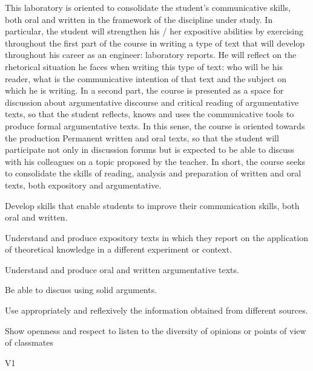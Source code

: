
\begin{syllabus}


\begin{justification}
This laboratory is oriented to consolidate the student's communicative skills, both oral and written in the framework of the discipline under study. In particular, the student will strengthen his / her expositive abilities by exercising throughout the first part of the course in writing a type of text that
will develop throughout his career as an engineer: laboratory reports. He will reflect on the rhetorical situation he faces when writing this type of text: who will be his reader, what is the communicative intention of that text and the subject on which he is writing.
In a second part, the course is presented as a space for discussion about argumentative discourse and critical reading of argumentative texts, so that the student reflects, knows and uses the communicative tools to produce formal argumentative texts. In this sense, the course is oriented towards the production
Permanent written and oral texts, so that the student will participate not only in discussion forums but is expected to be able to discuss with his colleagues on a topic proposed by the teacher. In short, the course seeks to consolidate the skills of reading, analysis and preparation of written and oral texts, both expository and argumentative.
\end{justification}

\begin{goals}
\item Develop skills that enable students to improve their communication skills, both oral and written.
\item Understand and produce expository texts in which they report on the application of theoretical knowledge in a different experiment or context.
\item Understand and produce oral and written argumentative texts.
\item Be able to discuss using solid arguments.
\item Use appropriately and reflexively the information obtained from different sources.
\item Show openness and respect to listen to the diversity of opinions or points of view of classmates
\end{goals}

\begin{outcomes}{V1}
    \item {}
    \item {}
\end{outcomes}


\end{syllabus}
